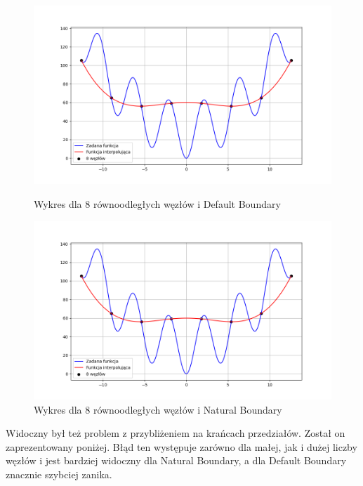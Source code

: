 \documentclass{article}
\begin{document}
\begin{figure}[H]
  \begin{minipage}[b]{0.49\textwidth}
    \includegraphics[width=\textwidth]{img23_n=8.png}
    \caption{Wykres dla 8 równoodległych węzłów i Default Boundary}
  \end{minipage}
  \hfill
  \begin{minipage}[b]{0.49\textwidth}
    \includegraphics[width=\textwidth]{img23_n=8.png}
    \caption{Wykres dla 8 równoodległych węzłów i Natural Boundary}
  \end{minipage}
\end{figure}

Widoczny był też problem z przybliżeniem na krańcach przedziałów. Został on zaprezentowany poniżej. Błąd ten występuje zarówno dla małej, jak i dużej liczby węzłów i jest bardziej widoczny dla Natural Boundary, a dla Default Boundary znacznie szybciej zanika.
\end{document}
